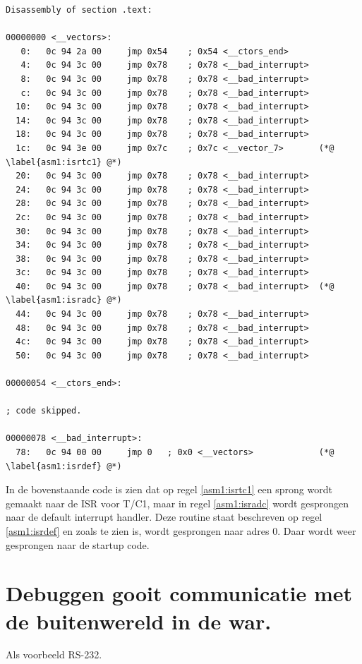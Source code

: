 \documentclass[12pt,a4paper,final,oneside,fleqn]{article}
\begin{document}
\begin{lstlisting}[language=AVR,caption=Deel van de assemblercode]
Disassembly of section .text:

00000000 <__vectors>:
   0:	0c 94 2a 00 	jmp	0x54	; 0x54 <__ctors_end>
   4:	0c 94 3c 00 	jmp	0x78	; 0x78 <__bad_interrupt>
   8:	0c 94 3c 00 	jmp	0x78	; 0x78 <__bad_interrupt>
   c:	0c 94 3c 00 	jmp	0x78	; 0x78 <__bad_interrupt>
  10:	0c 94 3c 00 	jmp	0x78	; 0x78 <__bad_interrupt>
  14:	0c 94 3c 00 	jmp	0x78	; 0x78 <__bad_interrupt>
  18:	0c 94 3c 00 	jmp	0x78	; 0x78 <__bad_interrupt>
  1c:	0c 94 3e 00 	jmp	0x7c	; 0x7c <__vector_7>       (*@ \label{asm1:isrtc1} @*)
  20:	0c 94 3c 00 	jmp	0x78	; 0x78 <__bad_interrupt>
  24:	0c 94 3c 00 	jmp	0x78	; 0x78 <__bad_interrupt>
  28:	0c 94 3c 00 	jmp	0x78	; 0x78 <__bad_interrupt>
  2c:	0c 94 3c 00 	jmp	0x78	; 0x78 <__bad_interrupt>
  30:	0c 94 3c 00 	jmp	0x78	; 0x78 <__bad_interrupt>
  34:	0c 94 3c 00 	jmp	0x78	; 0x78 <__bad_interrupt>
  38:	0c 94 3c 00 	jmp	0x78	; 0x78 <__bad_interrupt>
  3c:	0c 94 3c 00 	jmp	0x78	; 0x78 <__bad_interrupt>
  40:	0c 94 3c 00 	jmp	0x78	; 0x78 <__bad_interrupt>  (*@ \label{asm1:isradc} @*)
  44:	0c 94 3c 00 	jmp	0x78	; 0x78 <__bad_interrupt>
  48:	0c 94 3c 00 	jmp	0x78	; 0x78 <__bad_interrupt>
  4c:	0c 94 3c 00 	jmp	0x78	; 0x78 <__bad_interrupt>
  50:	0c 94 3c 00 	jmp	0x78	; 0x78 <__bad_interrupt>

00000054 <__ctors_end>:

; code skipped.

00000078 <__bad_interrupt>:
  78:	0c 94 00 00 	jmp	0	; 0x0 <__vectors>             (*@ \label{asm1:isrdef} @*)  
\end{lstlisting}

In de bovenstaande code is zien dat op regel \ref{asm1:isrtc1} een sprong
wordt gemaakt naar de ISR voor T/C1, maar in regel \ref{asm1:isradc} wordt
gesprongen naar de default interrupt handler. Deze routine staat beschreven
op regel \ref{asm1:isrdef} en zoals te zien is, wordt gesprongen naar adres
0. Daar wordt weer gesprongen naar de startup code.

\section{Debuggen gooit communicatie met de buitenwereld in de war.}
Als voorbeeld RS-232.
\end{document}
